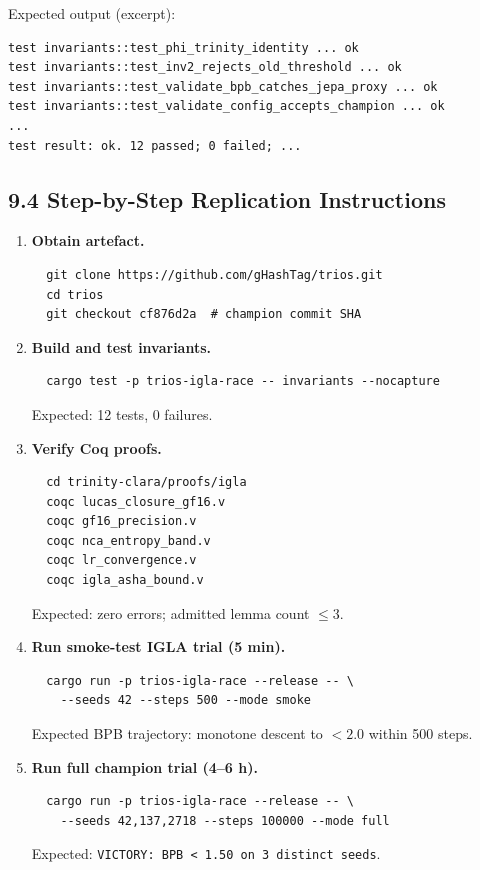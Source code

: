 Expected output (excerpt):
\begin{verbatim}
test invariants::test_phi_trinity_identity ... ok
test invariants::test_inv2_rejects_old_threshold ... ok
test invariants::test_validate_bpb_catches_jepa_proxy ... ok
test invariants::test_validate_config_accepts_champion ... ok
...
test result: ok. 12 passed; 0 failed; ...
\end{verbatim}

\subsection{9.4 Step-by-Step Replication Instructions}%
\label{sec:ae-steps}

\begin{enumerate}
\item \textbf{Obtain artefact.}
  \begin{verbatim}
  git clone https://github.com/gHashTag/trios.git
  cd trios
  git checkout cf876d2a  # champion commit SHA
  \end{verbatim}

\item \textbf{Build and test invariants.}
  \begin{verbatim}
  cargo test -p trios-igla-race -- invariants --nocapture
  \end{verbatim}
  Expected: 12 tests, 0 failures.

\item \textbf{Verify Coq proofs.}
  \begin{verbatim}
  cd trinity-clara/proofs/igla
  coqc lucas_closure_gf16.v
  coqc gf16_precision.v
  coqc nca_entropy_band.v
  coqc lr_convergence.v
  coqc igla_asha_bound.v
  \end{verbatim}
  Expected: zero errors; admitted lemma count $\leq 3$.

\item \textbf{Run smoke-test IGLA trial (5 min).}
  \begin{verbatim}
  cargo run -p trios-igla-race --release -- \
    --seeds 42 --steps 500 --mode smoke
  \end{verbatim}
  Expected BPB trajectory: monotone descent to $< 2.0$ within 500 steps.

\item \textbf{Run full champion trial (4–6 h).}
  \begin{verbatim}
  cargo run -p trios-igla-race --release -- \
    --seeds 42,137,2718 --steps 100000 --mode full
  \end{verbatim}
  Expected: \texttt{VICTORY: BPB < 1.50 on 3 distinct seeds}.


\end{enumerate}
